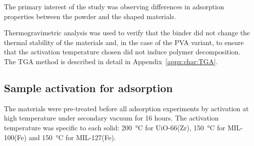 The primary interest of the study was observing differences 
in adsorption properties between the powder and the shaped materials.

Thermogravimetric analysis was used to verify that the binder 
did not change the thermal stability of the materials and, in the 
case of the PVA variant, to ensure that the activation temperature
chosen did not induce polymer decomposition. The TGA method is described 
in detail in Appendix~\ref{appx:char:TGA}.

\subsection{Sample activation for adsorption}

The materials were pre-treated before all adsorption experiments by activation at high 
temperature under secondary vacuum for 16 hours. The activation temperature was specific
to each solid: \SI{200}{\degreeCelsius} for UiO-66(Zr), \SI{150}{\degreeCelsius}
for MIL-100(Fe) and \SI{150}{\degreeCelsius} for MIL-127(Fe).
